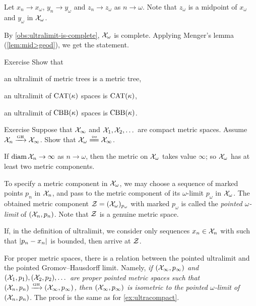 Let $x_n\to x_\omega$, $y_n\to y_\omega$ and $z_n\to z_\omega$ as $n\to \omega$.
Note that $z_\omega$ is a midpoint of $x_\omega$ and $y_\omega$ in $\mathcal{X}_\omega$.

By \ref{obs:ultralimit-is-complete}, $\mathcal{X}_\omega$ is complete.
Applying Menger's lemma (\ref{lem:mid>geod}), we get the statement.
\qeds


\begin{thm}{Exercise}\label{ex:lim(tree)}
Show that

\begin{subthm}{} an ultralimit of metric trees is a metric tree,
\end{subthm}

\begin{subthm}{} an ultralimit of $\mathrm{CAT}(\kappa)$ spaces is $\mathrm{CAT}(\kappa)$,
\end{subthm}

\begin{subthm}{} an ultralimit of $\mathrm{CBB}(\kappa)$ spaces is $\mathrm{CBB}(\kappa)$. 
\end{subthm}

\end{thm}

\begin{thm}{Exercise}\label{ex:ultracompact}
Suppose that $\mathcal{X}_\infty$ and $\mathcal{X}_1,\mathcal{X}_2,\dots$ are compact metric spaces.
Assume $\mathcal{X}_n\xrightarrow{\mbox{\tiny\rm GH}}\mathcal{X}_\infty$.
Show that $\spc{X}_\omega\iso\spc{X}_\infty$.
\end{thm}

If $\operatorname{\rm diam}\nolimits \mathcal{X}_n\to \infty$ as $n\to\omega$,
then the metric on $\mathcal{X}_\omega$ takes value $\infty$;
so $\mathcal{X}_\omega$ has at least two metric components.

To specify a metric component in $\mathcal{X}_\omega$,
we may choose a sequence of marked points $p_n$ in $\mathcal{X}_n$, and pass to the metric component of its $\omega$-limit $p_\omega$ in $\mathcal{X}_\omega$.
The obtained metric component $\mathcal{Z}=(\mathcal{X}_\omega)_{p_\omega}$ with marked $p_\omega$ is called the \emph{pointed $\omega$-limit} of $(\mathcal{X}_n,p_n)$.
Note that $\mathcal{Z}$ is a genuine metric space.

If, in the definition of ultralimit, we consider only sequences $x_n\z\in \spc{X}_n$ with such that $\dist{p_n}{x_n}{}$ is bounded, 
then arrive at $\mathcal{Z}$.  

For proper metric spaces, there is a relation between the pointed ultralimit and the pointed Gromov--Hausdorff limit.
Namely, \textit{if $(\mathcal{X}_\infty,p_\infty)$ and $(\mathcal{X}_1,p_1),(\mathcal{X}_2,p_2),\dots$ are proper pointed metric spaces such that $(\mathcal{X}_n,p_n)\xrightarrow{\mbox{\tiny\rm GH}}(\mathcal{X}_\infty,p_\infty)$, then $(\mathcal{X}_\infty,p_\infty)$ is isometric to the pointed $\omega$-limit of $(\mathcal{X}_n,p_n)$.}
The proof is the same as for \ref{ex:ultracompact}.





